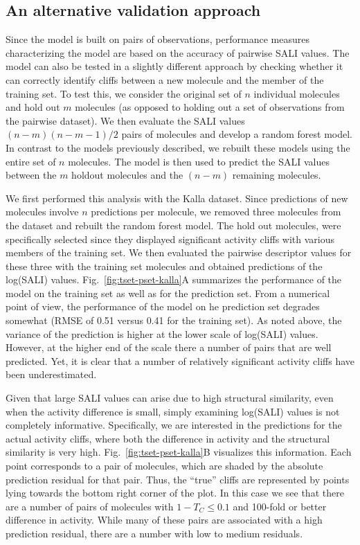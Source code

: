 \documentclass[letterpaper, 12pt]{article}
\begin{document}
\subsection{An alternative validation approach}
\label{sec:an-altern-valid}


Since the model is built on pairs of observations, performance measures characterizing the model are
based on the accuracy of pairwise SALI values. The model can also be tested in a slightly different
approach by checking whether it can correctly identify cliffs between a new molecule and the member
of the training set. To test this, we consider the original set of $n$ individual molecules and hold
out $m$ molecules (as opposed to holding out a set of observations from the pairwise dataset). We
then evaluate the SALI values $(n-m)(n-m-1)/2$ pairs of molecules and develop a random forest
model. In contrast to the models previously described, we rebuilt these models using the entire set
of $n$ molecules. The model is then used to predict the SALI values between the $m$ holdout
molecules and the $(n-m)$ remaining molecules.

We first performed this analysis with the Kalla dataset. Since predictions of new molecules involve
$n$ predictions per molecule, we removed three molecules from the dataset and rebuilt the random
forest model. The hold out molecules, were specifically selected since they displayed significant
activity cliffs with various members of the training set. We then evaluated the pairwise descriptor
values for these three with the training set molecules and obtained predictions of the log(SALI)
values. Fig.~\ref{fig:tset-pset-kalla}A summarizes the performance of the model on the training set
as well as for the prediction set. From a numerical point of view, the performance of the model on
he prediction set degrades somewhat (RMSE of 0.51 versus 0.41 for the training set). As noted above,
the variance of the prediction is higher at the lower scale of log(SALI) values. However, at the
higher end of the scale there a number of pairs that are well predicted. Yet, it is clear that a
number of relatively significant activity cliffs have been underestimated.

Given that large SALI values can arise due to high structural similarity, even when the activity
difference is small, simply examining log(SALI) values is not completely informative. Specifically,
we are interested in the predictions for the actual activity cliffs, where both the difference in
activity and the structural similarity is very high. Fig.~\ref{fig:tset-pset-kalla}B visualizes this
information. Each point corresponds to a pair of molecules, which are shaded by the absolute
prediction residual for that pair. Thus, the ``true'' cliffs are represented by points lying towards
the bottom right corner of the plot. In this case we see that there are a number of pairs of
molecules with $1 - T_C \leq 0.1$ and 100-fold or better difference in activity. While many of these
pairs are associated with a high prediction residual, there are a number with low to medium
residuals.
  
\end{document}
